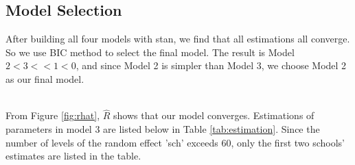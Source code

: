 \documentclass{article}
\begin{document}
\subsection{Model Selection}

After building all four models with stan, we find that all estimations all converge. So we use BIC method to select the final model. 
The result is Model $2<3<<1<0$, and since Model 2 is simpler than Model 3, we choose Model 2 as our final model.

\begin{minipage}{\linewidth}
    \label{fig:rhat}
\end{minipage}\\

From Figure \ref{fig:rhat}, $\hat{R}$ shows that our model converges. Estimations of parameters in model 3 are listed below in 
Table \ref{tab:estimation}. Since the number of levels of the random effect 'sch' exceeds 60, 
only the first two schools' estimates are listed in the table.
\end{document}

